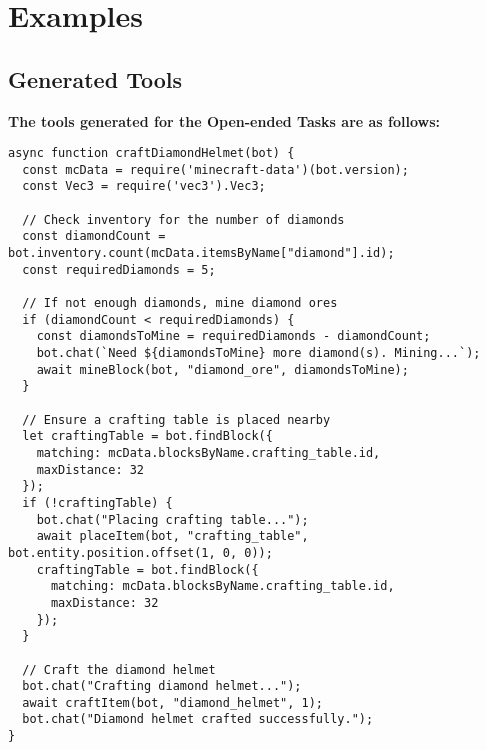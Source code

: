 \section{Examples}
\label{app:example}
\subsection{Generated Tools}

\textbf{The tools generated for the Open-ended Tasks are as follows:}
\begin{tcolorbox}[title=CraftDiamondHelmet, width=\textwidth,top=0mm,  breakable]
\begin{Verbatim}[breaklines=true, breakanywhere=true, fontsize=\footnotesize]
async function craftDiamondHelmet(bot) {
  const mcData = require('minecraft-data')(bot.version);
  const Vec3 = require('vec3').Vec3;

  // Check inventory for the number of diamonds
  const diamondCount = bot.inventory.count(mcData.itemsByName["diamond"].id);
  const requiredDiamonds = 5;

  // If not enough diamonds, mine diamond ores
  if (diamondCount < requiredDiamonds) {
    const diamondsToMine = requiredDiamonds - diamondCount;
    bot.chat(`Need ${diamondsToMine} more diamond(s). Mining...`);
    await mineBlock(bot, "diamond_ore", diamondsToMine);
  }

  // Ensure a crafting table is placed nearby
  let craftingTable = bot.findBlock({
    matching: mcData.blocksByName.crafting_table.id,
    maxDistance: 32
  });
  if (!craftingTable) {
    bot.chat("Placing crafting table...");
    await placeItem(bot, "crafting_table", bot.entity.position.offset(1, 0, 0));
    craftingTable = bot.findBlock({
      matching: mcData.blocksByName.crafting_table.id,
      maxDistance: 32
    });
  }

  // Craft the diamond helmet
  bot.chat("Crafting diamond helmet...");
  await craftItem(bot, "diamond_helmet", 1);
  bot.chat("Diamond helmet crafted successfully.");
}
\end{Verbatim}
\end{tcolorbox}



